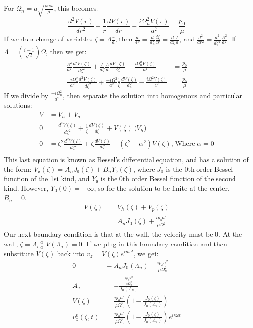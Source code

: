 \documentclass[11pt,letterpaper]{article}
\begin{document}
For $\Omega_n = a \sqrt{\frac{\rho n \omega}{\mu}}$, this becomes:
\begin{equation*}
    \frac{d^2 V(r)}{d r^2} + \frac{1}{r} \frac{d V(r)}{d r} - \frac{i \Omega_n^2 V(r)}{a^2} = \frac{p_0}{\mu}
\end{equation*}
If we do a change of variables $\zeta = \Lambda \frac{r}{a}$, then $\frac{d}{d r} = \frac{d}{d \zeta} \frac{d \zeta}{d r} = \frac{d}{d \zeta}\frac{\Lambda}{a}$, and $\frac{d^2}{d r^2} = \frac{d^2}{d \zeta^2} \frac{\Lambda^2}{a^2}$.  If $\Lambda = \left(\frac{i - 1}{\sqrt{2}}\right) \Omega$, then we get:
\begin{align*}
    \frac{\Lambda^2}{a^2} \frac{d^2 V(\zeta)}{d \zeta^2} + \frac{\Lambda}{a \zeta}\frac{\Lambda}{a} \frac{d V(\zeta)}{d \zeta} - \frac{i \Omega_n^2 V(\zeta)}{a^2} &= \frac{p_0}{\mu}\\
    \frac{-i \Omega_n^2}{a^2} \frac{d^2 V(\zeta)}{d \zeta^2} + \frac{-i \Omega^2}{a^2}\frac{1}{ \zeta} \frac{d V(\zeta)}{d \zeta} - \frac{i \Omega^2 V(\zeta)}{a^2} &= \frac{p_0}{\mu}
\end{align*}
If we divide by $\frac{-i \Omega_n^2}{a^2}$, then separate the solution into homogenous and particular solutions:
\begin{align*}
    V &= V_h + V_p\\
    0 &= \frac{d^2 V(\zeta)}{d \zeta^2} + \frac{1}{\zeta}\frac{d V(\zeta)}{d \zeta} +  V(\zeta) \ \textrm{($V_h$)}\\
    0 &= \zeta^2 \frac{d^2 V(\zeta)}{d \zeta^2} + \zeta\frac{d V(\zeta)}{d \zeta} +  (\zeta^2 - \alpha^2) V(\zeta)  \textrm{, Where $\alpha = 0$}\\
\end{align*}
This last equation is known as Bessel's differential equation, and has a solution of the form: $V_h(\zeta) = A_n J_0(\zeta) + B_n Y_0(\zeta)$, where $J_0$ is the 0th order Bessel function of the 1st kind, and $Y_0$ is the 0th order Bessel function of the second kind.  However, $Y_0(0) = -\infty$, so for the solution to be finite at the center, $B_n = 0$.
\begin{align*}
    V(\zeta) &= V_h(\zeta) + V_p(\zeta)\\
         &= A_n J_0(\zeta) + \frac{i p_o a^2}{\mu \Omega^2} 
\end{align*}
Our next boundary condition is that at the wall, the velocity must be 0.  At the wall, $\zeta = \Lambda_n \frac{a}{a}$ $V(\Lambda_n) = 0$.  If we plug in this boundary condition and then substitute $V(\zeta)$ back into $v_z = V(\zeta) e^{i n \omega t}$, we get:
\begin{align*}
    0 &= A_n J_0(\Lambda_n) + \frac{i p_o a^2}{\mu \Omega_n^2} \\
    A_n &= -\frac{\frac{i p_o a^2}{\mu \Omega_n^2}}{J_0(\Lambda_n)} \\
    V(\zeta) &= \frac{i p_o a^2}{\mu \Omega_n^2}\left(1 - \frac{J_0(\zeta)}{J_0(\Lambda_n)} \right)\\
    v_z^n(\zeta,t) &= \frac{i p_o a^2}{\mu \Omega_n^2}\left(1 - \frac{J_0(\zeta)}{J_0(\Lambda_n)} \right) e^{i n \omega t}
\end{align*}
\end{document}
